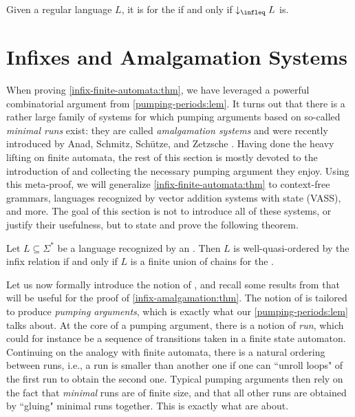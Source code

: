 \begin{corollary}
    Given a regular language $L$, it is  
    for the  if and only if 
    $\dwset[\infleq] L$ is.
\end{corollary}

\section{Infixes and Amalgamation Systems}
\label{infixes-amalgamation:sec}

When proving \cref{infix-finite-automata:thm}, we have leveraged a powerful
combinatorial argument from \cref{pumping-periods:lem}. It turns out that there
is a rather large family of systems for which pumping arguments based on
so-called \emph{minimal runs} exist: they are called \emph{amalgamation
systems} and were recently introduced by Anad, Schmitz, Sch\"{u}tze, and
Zetzsche \cite{ASZZ24}. Having done the heavy lifting on finite automata, the
rest of this section is mostly devoted to the introduction of  and collecting the necessary pumping argument they enjoy. Using this
meta-proof, we will generalize \cref{infix-finite-automata:thm} to context-free
grammars, languages recognized by vector addition systems with state (VASS),
and more. The goal of this section is not to introduce all of these systems, or
justify their usefulness, but to state and prove the following theorem.

\begin{theorem}[label=infix-amalgamation:thm,restate=infix-amalgamation:thm]
    Let $L \subseteq \Sigma^*$ be a language recognized by an 
    .
    Then $L$ is well-quasi-ordered by the infix relation if and only if $L$ is
    a finite union of chains for the .
\end{theorem}

Let us now formally introduce the notion of , and
recall some results from \cite{ASZZ24} that will be useful for the proof of
\cref{infix-amalgamation:thm}. The notion of  is
tailored to produce \emph{pumping arguments}, which is exactly what our
\cref{pumping-periods:lem} talks about. At the core of a pumping argument,
there is a notion of \emph{run}, which could for instance be a sequence of
transitions taken in a finite state automaton. Continuing on the analogy with
finite automata, there is a natural ordering between runs, i.e., a run is
smaller than another one if one can ``unroll loops" of the first run to obtain
the second one. Typical pumping arguments then rely on the fact that
\emph{minimal} runs are of finite size, and that all other runs are
obtained by ``gluing" minimal runs together. This is exactly what
 are about.

